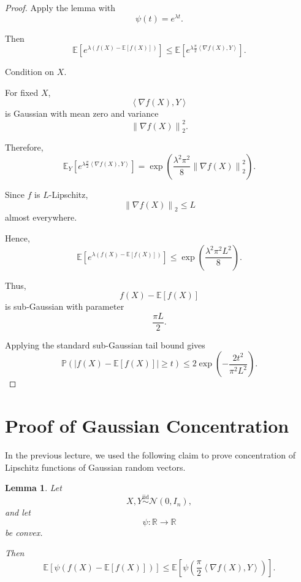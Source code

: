 \documentclass[12pt,oneside]{book}
\numberwithin{equation}{section}
\theoremstyle{definition}
\theoremstyle{plain}
\newtheorem{lemma}{Lemma}[section]
\theoremstyle{remark}
\newcommand{\R}{\mathbb{R}}
\newcommand{\E}{\mathbb{E}}
\newcommand{\Prob}{\mathbb{P}}
\newcommand{\iid}{\overset{\text{iid}}{\sim}}
\newcommand{\norm}[1]{\left\lVert #1 \right\rVert}
\newcommand{\inner}[2]{\left\langle #1, #2 \right\rangle}
\newcommand{\grad}{\nabla}
\newcommand{\Normal}{\mathcal{N}}
\begin{document}
\begin{proof}
Apply the lemma with
\[
\psi(t)=e^{\lambda t}.
\]

Then
\[
\E\left[
e^{\lambda(f(X)-\E[f(X)])}
\right]
\leq
\E\left[
e^{\lambda \frac{\pi}{2}\inner{\grad f(X)}{Y}}
\right].
\]

Condition on $X$.

For fixed $X$,
\[
\inner{\grad f(X)}{Y}
\]
is Gaussian with mean zero and variance
\[
\norm{\grad f(X)}_2^2.
\]

Therefore,
\[
\E_Y\left[
e^{\lambda \frac{\pi}{2}\inner{\grad f(X)}{Y}}
\right]
=
\exp\left(
\frac{\lambda^2\pi^2}{8}
\norm{\grad f(X)}_2^2
\right).
\]

Since $f$ is $L$-Lipschitz,
\[
\norm{\grad f(X)}_2
\leq
L
\]
almost everywhere.

Hence,
\[
\E\left[
e^{\lambda(f(X)-\E[f(X)])}
\right]
\leq
\exp\left(
\frac{\lambda^2\pi^2L^2}{8}
\right).
\]

Thus,
\[
f(X)-\E[f(X)]
\]
is sub-Gaussian with parameter
\[
\frac{\pi L}{2}.
\]

Applying the standard sub-Gaussian tail bound gives
\[
\Prob\left(
|f(X)-\E[f(X)]|
\geq t
\right)
\leq
2\exp\left(
-\frac{2t^2}{\pi^2L^2}
\right).
\]
\end{proof}

\section{Proof of Gaussian Concentration}

In the previous lecture, we used the following claim to prove concentration of Lipschitz functions of Gaussian random vectors.

\begin{lemma}
Let
\[
X,Y\iid \Normal(0,I_n),
\]
and let
\[
\psi:\R\to\R
\]
be convex.

Then
\[
\E\left[
\psi(f(X)-\E[f(X)])
\right]
\leq
\E\left[
\psi\left(
\frac{\pi}{2}
\inner{\grad f(X)}{Y}
\right)
\right].
\]
\end{lemma}
\end{document}
